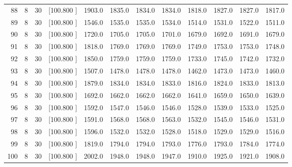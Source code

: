 \documentclass[12pt,a4paper]{article}
\begin{document}
\begin{center}
{\begin{tabular}{r r r r r r r r r r r r}
  88&  8& 30&[100.800   ]&  1903.0&  1835.0&  1834.0&  1834.0&  1818.0&  1827.0&  1827.0&  1817.0\\[-0.02in]
  89&  8& 30&[100.800   ]&  1546.0&  1535.0&  1535.0&  1534.0&  1514.0&  1531.0&  1522.0&  1511.0\\[-0.02in]
  90&  8& 30&[100.800   ]&  1720.0&  1705.0&  1705.0&  1701.0&  1679.0&  1692.0&  1691.0&  1679.0\\[-0.02in]
  91&  8& 30&[100.800   ]&  1818.0&  1769.0&  1769.0&  1769.0&  1749.0&  1753.0&  1753.0&  1748.0\\[-0.02in]
  92&  8& 30&[100.800   ]&  1850.0&  1759.0&  1759.0&  1759.0&  1733.0&  1745.0&  1742.0&  1732.0\\[-0.02in]
  93&  8& 30&[100.800   ]&  1507.0&  1478.0&  1478.0&  1478.0&  1462.0&  1473.0&  1473.0&  1460.0\\[-0.02in]
  94&  8& 30&[100.800   ]&  1879.0&  1834.0&  1834.0&  1833.0&  1816.0&  1824.0&  1833.0&  1813.0\\[-0.02in]
  95&  8& 30&[100.800   ]&  1692.0&  1662.0&  1662.0&  1662.0&  1641.0&  1659.0&  1650.0&  1639.0\\[-0.02in]
  96&  8& 30&[100.800   ]&  1592.0&  1547.0&  1546.0&  1546.0&  1528.0&  1539.0&  1533.0&  1525.0\\[-0.02in]
  97&  8& 30&[100.800   ]&  1591.0&  1568.0&  1568.0&  1563.0&  1532.0&  1545.0&  1546.0&  1531.0\\[-0.02in]
  98&  8& 30&[100.800   ]&  1596.0&  1532.0&  1532.0&  1528.0&  1518.0&  1529.0&  1529.0&  1516.0\\[-0.02in]
  99&  8& 30&[100.800   ]&  1819.0&  1794.0&  1794.0&  1793.0&  1776.0&  1793.0&  1784.0&  1774.0\\[-0.02in]
 100&  8& 30&[100.800   ]&  2002.0&  1948.0&  1948.0&  1947.0&  1910.0&  1925.0&  1921.0&  1908.0\\[-0.02in]

\hline
\end{tabular}}
\end{center}
\newpage
\end{document}

